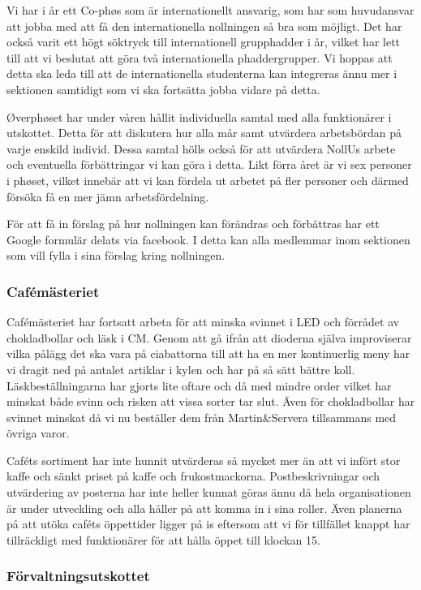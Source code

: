 \documentclass[../_main/handlingar.tex]{subfiles}
\begin{document}
Vi har i år ett Co-phøs som är internationellt ansvarig, som har som huvudansvar att jobba med att få den internationella nollningen så bra som möjligt. Det har också varit ett högt söktryck till internationell grupphadder i år, vilket har lett till att vi beslutat att göra två internationella phaddergrupper. Vi hoppas att detta ska leda till att de internationella studenterna kan integreras ännu mer i sektionen samtidigt som vi ska fortsätta jobba vidare på detta.

Øverphøset har under våren hållit individuella samtal med alla funktionärer i utskottet. Detta för att diskutera hur alla mår samt utvärdera arbetsbördan på varje enskild individ. Dessa samtal hölls också för att utvärdera NollUs arbete och eventuella förbättringar vi kan göra i detta. Likt förra året är vi sex personer i phøset, vilket innebär att vi kan fördela ut arbetet på fler personer och därmed försöka få en mer jämn arbetsfördelning. 

För att få in förslag på hur nollningen kan förändras och förbättras har ett Google formulär delats via facebook. I detta kan alla medlemmar inom sektionen som vill fylla i sina förslag kring nollningen.

\subsubsection*{Cafémästeriet}
Cafémästeriet har fortsatt arbeta för att minska svinnet i LED och förrådet av chokladbollar och läsk i CM. Genom att gå ifrån att dioderna själva improviserar vilka pålägg det ska vara på ciabattorna till att ha en mer kontinuerlig meny har vi dragit ned på antalet artiklar i kylen och har på så sätt bättre koll. Läskbeställningarna har gjorts lite oftare och då med mindre order vilket har minskat både svinn och risken att vissa sorter tar slut. Även för chokladbollar har svinnet minskat då vi nu beställer dem från Martin&Servera tillsammans med övriga varor. 

Caféts sortiment har inte hunnit utvärderas så mycket mer än att vi infört stor kaffe och sänkt priset på kaffe och frukostmackorna. Postbeskrivningar och utvärdering av posterna har inte heller kunnat göras ännu då hela organisationen är under utveckling och alla håller på att komma in i sina roller. Även planerna på att utöka caféts öppettider ligger på is eftersom att vi för tillfället knappt har tillräckligt med funktionärer för att hålla öppet till klockan 15. 

\subsubsection*{Förvaltningsutskottet}
\end{document}
